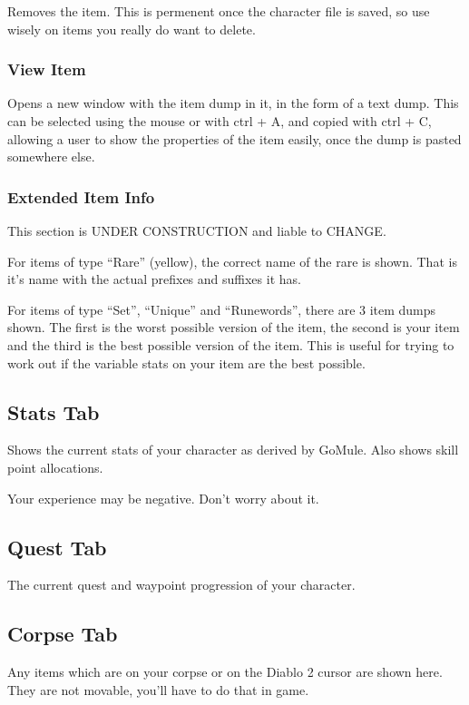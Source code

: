 \documentclass[a4paper,10pt]{article}
\begin{document}
Removes the item. This is permenent once the character file is saved, so use wisely on items you really do want to delete.

\subsubsection{View Item}

Opens a new window with the item dump in it, in the form of a text dump. This can be selected using the mouse or with ctrl + A, and copied with ctrl + C, allowing a user to show the properties of the item easily, once the dump is pasted somewhere else.

\subsubsection{Extended Item Info}

This section is UNDER CONSTRUCTION and liable to CHANGE.

For items of type ``Rare'' (yellow), the correct name of the rare is shown. That is it's name with the actual prefixes and suffixes it has.

For items of type ``Set'', ``Unique'' and ``Runewords'', there are 3 item dumps shown. The first is the worst possible version of the item, the second is your item and the third is the best possible version of the item. This is useful for trying to work out if the variable stats on your item are the best possible.

\subsection{Stats Tab}

Shows the current stats of your character as derived by GoMule. Also shows skill point allocations.

Your experience may be negative. Don't worry about it.

\subsection{Quest Tab}

The current quest and waypoint progression of your character.

\subsection{Corpse Tab}

Any items which are on your corpse or on the Diablo 2 cursor are shown here. They are not movable, you'll have to do that in game.
\end{document}
